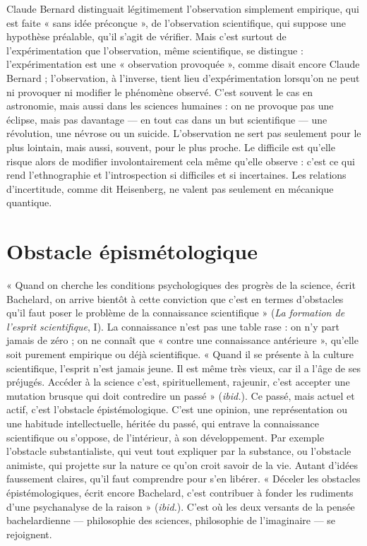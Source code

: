 Claude Bernard distinguait légitimement l’observation simplement empirique,
qui est faite « sans idée préconçue », de l'observation scientifique, qui
suppose une hypothèse préalable, qu’il s’agit de vérifier. Mais c’est surtout de
l’expérimentation que l'observation, même scientifique, se distingue : l’expérimentation
est une « observation provoquée », comme disait encore Claude
Bernard ; l'observation, à l'inverse, tient lieu d’expérimentation lorsqu'on ne
peut ni provoquer ni modifier le phénomène observé. C’est souvent le cas en
astronomie, mais aussi dans les sciences humaines : on ne provoque pas une
éclipse, mais pas davantage — en tout cas dans un but scientifique — une révolution,
une névrose ou un suicide. L'observation ne sert pas seulement pour le
plus lointain, mais aussi, souvent, pour le plus proche. Le difficile est qu’elle
risque alors de modifier involontairement cela même qu’elle observe : c’est ce
qui rend l’ethnographie et l’introspection si difficiles et si incertaines. Les relations
d’incertitude, comme dit Heisenberg, ne valent pas seulement en mécanique quantique.

\section{Obstacle épismétologique}
« Quand on cherche les conditions psychologiques
des progrès de la science,
écrit Bachelard, on arrive bientôt à cette conviction que c’est en termes d’obstacles
qu’il faut poser le problème de la connaissance scientifique » ({\it La formation
de l'esprit scientifique}, I). La connaissance n’est pas une table rase : on n’y
part jamais de zéro ; on ne connaît que « contre une connaissance antérieure »,
qu'elle soit purement empirique ou déjà scientifique. « Quand il se présente à
la culture scientifique, l'esprit n’est jamais jeune. Il est même très vieux, car il a
l’âge de ses préjugés. Accéder à la science c’est, spirituellement, rajeunir, c’est
accepter une mutation brusque qui doit contredire un passé » ({\it ibid.}). Ce passé,
mais actuel et actif, c’est l’obstacle épistémologique. C’est une opinion, une
représentation ou une habitude intellectuelle, héritée du passé, qui entrave la
connaissance scientifique ou s'oppose, de l’intérieur, à son développement. Par
exemple l’obstacle substantialiste, qui veut tout expliquer par la substance, ou
l'obstacle animiste, qui projette sur la nature ce qu’on croit savoir de la vie.
Autant d’idées faussement claires, qu’il faut comprendre pour s’en libérer.
« Déceler les obstacles épistémologiques, écrit encore Bachelard, c’est contribuer
à fonder les rudiments d’une psychanalyse de la raison » ({\it ibid.}). C’est où
les deux versants de la pensée bachelardienne — philosophie des sciences, philosophie
de l’imaginaire — se rejoignent.

